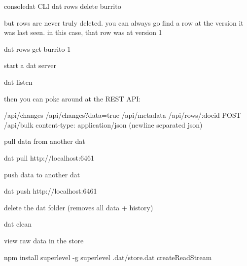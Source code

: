 \begin{srclst}{console}{dat CLI}
    dat rows delete burrito

but rows are never truly deleted. you can always go find a row at the version it was last seen. in this case, that row was at version 1

    dat rows get burrito 1

start a dat server

    dat listen

then you can poke around at the REST API:

    /api/changes
    /api/changes?data=true
    /api/metadata
    /api/rows/:docid
    POST /api/bulk content-type: application/json (newline separated json)

pull data from another dat

    dat pull http://localhost:6461

push data to another dat

    dat push http://localhost:6461

delete the dat folder (removes all data + history)

    dat clean

view raw data in the store

    npm install superlevel -g
    superlevel .dat/store.dat createReadStream
\end{srclst}